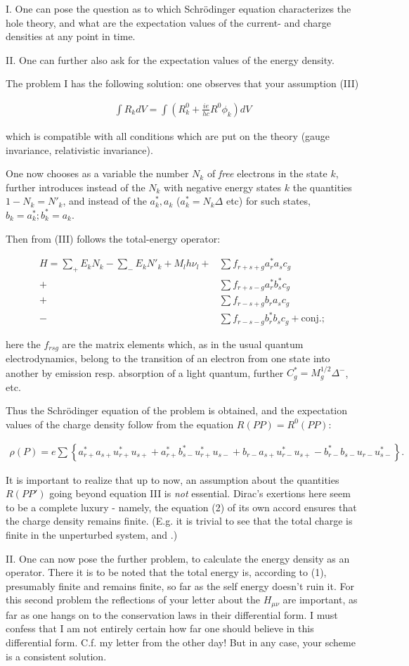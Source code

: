 \documentclass{article}
\newcommand{\nequ}[2]{
\begin{align*}
#1
\tag{#2}
\end{align*}
}
\newcommand{\uequ}[1]{
\begin{align*}
#1
\end{align*}
}
\newcommand{\sumX}[1]{\underset{#1}{\sum}}
\begin{document}
I. One can pose the question as to which Schr\"odinger equation characterizes the hole theory, and what are the expectation values of the current- and charge densities at any point in time.

II. One can further also ask for the expectation values of the energy density.

The problem I has the following solution: one observes that your assumption (III)
\uequ{
\int{R_k {dV}} = \int{\left(R^0_k + \frac{ie}{hc}R^0 \phi_k \right)}{dV}
}
which is compatible with all conditions which are put on the theory (gauge invariance, relativistic invariance).

One now chooses as a variable the number $N_k$ of \textit{free} electrons in the state $k$, further introduces instead of the $N_k$ with negative energy states $k$ the quantities $1-N_k = {N'}_k$, and instead of the $a^*_k, a_k$ ($a^*_k=N_k \Delta$ etc) for such states, $b_k = a^*_k; b^*_k = a_k$.

Then from (III) follows the total-energy operator:
\nequ{
H = \sumX{+}{E_k N_k} - \sumX{-}{E_k {N'}_k} + M_l h\nu_l 
+ &\sum{f_{r+s+g}a^*_r a_s c_g}\\
+ &\sum{f_{r+s-g}a^*_r b^*_s  c_g}\\
+ &\sum{f_{r-s+g}b_r a_s c_g}\\
- &\sum{f_{r-s-g}b^*_r b_s c_g} + \text{conj.};
}{1}
here the $f_{rsg}$ are the matrix elements which, as in the usual quantum electrodynamics, belong to the transition of an electron from one state into another by emission resp. absorption of a light quantum, further $C^*_g = M^{1/2}_g \Delta^-$, etc.

Thus the Schr\"odinger equation of the problem is obtained, and the expectation values of the charge density follow from the equation $R(PP) = R^0(PP)$:
\nequ{
\rho(P) = e\sum{\left\{
a^*_{r+} a_{s+} u^*_{r+} u_{s+} + 
a^*_{r+} b^*_{s-} u^*_{r+} u_{s-} +
b_{r-} a_{s+} u^*_{r-} u_{s+} -
b^*_{r-} b_{s-} u_{r-} u^*_{s-}
\right\}}.
}{2}

It is important to realize that up to now, an assumption about the quantities $R(PP')$ going beyond equation III is \textit{not} essential. Dirac's exertions here seem to be a complete luxury - namely, the equation (2) of its own accord ensures that the charge density remains finite. (E.g. it is trivial to see that the total charge is finite in the unperturbed system, and .)

II. One can now pose the further problem, to calculate the energy density as an operator. There it is to be noted that the total energy is, according to (1), presumably finite and remains finite, so far as the self energy doesn't ruin it. For this second problem the reflections of your letter about the $H_{\mu\nu}$ are important, as far as one hangs on to the conservation laws in their differential form. I must confess that I am not entirely certain how far one should believe in this differential form. C.f. my letter from the other day! But in any case, your scheme is a consistent solution.
\end{document}
